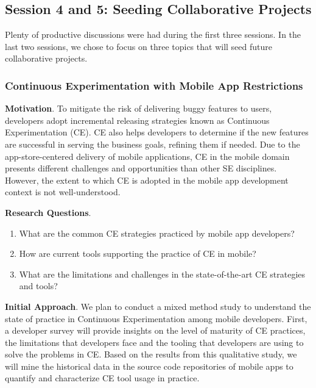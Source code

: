 \documentclass[a4paper]{article}
\newcommand{\smallsection}[1]{\noindent \textbf{#1}. }
\begin{document}
\subsection{Session 4 and 5: Seeding Collaborative Projects}

Plenty of productive discussions were had during the first three sessions. In the last two sessions, we chose to focus on three topics that will seed future collaborative projects.

\subsubsection{Continuous Experimentation with Mobile App Restrictions}

\smallsection{Motivation}
To mitigate the risk of delivering buggy features to users, developers adopt incremental releasing strategies known as Continuous Experimentation (CE). CE also helps developers to determine if the new features are successful in serving the business goals, refining them if needed. Due to the app-store-centered delivery of mobile applications, CE in the mobile domain presents different challenges and opportunities than other SE disciplines. However, the extent to which CE is adopted in the mobile app development context is not well-understood.

\vspace{2mm}
\smallsection{Research Questions}

\begin{enumerate}[\bfseries RQ1]
	\item What are the common CE strategies practiced by mobile app developers?
	\item How are current tools supporting the practice of CE in mobile?
	\item What are the limitations and challenges in the state-of-the-art CE strategies and tools?
\end{enumerate}

\smallsection{Initial Approach}
We plan to conduct a mixed method study to understand the state of practice in Continuous Experimentation among mobile developers. First, a developer survey will provide insights on the level of maturity of CE practices, the limitations that developers face and the tooling that developers are using to solve the problems in CE. Based on the results from this qualitative study, we will mine the historical data in the source code repositories of mobile apps to quantify and characterize CE tool usage in practice.
\end{document}
